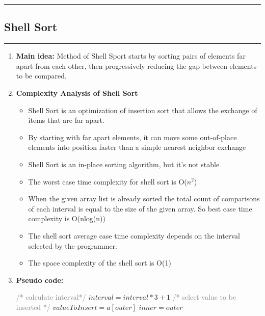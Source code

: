 \documentclass[11pt,a4paper]{article}
\begin{document}
{		\rule{15cm}{0.1cm}
		\subsection{Shell Sort}
		\rule{15cm}{0.1cm}
			\begin{enumerate}[label=\textbf{\arabic*})]
				\item \textbf{Main idea:}
				Method of Shell Sport starts by sorting pairs of elements far apart from each other, then progressively reducing the gap between elements to be compared.
				\\[12pt]
				\item \textbf{Complexity Analysis of Shell Sort}
				\begin{itemize}
				\item Shell Sort is an optimization of insertion sort that allows the exchange of items that are far apart.
                \item By starting with far apart elements, it can move some out-of-place elements into position faster than a simple nearest neighbor exchange
                \item Shell Sort is an in-place sorting algorithm, but it’s not stable
                \item The worst case time complexity for shell sort is O($n^2$)
                \item When the given array list is already sorted the total count of comparisons of each interval is equal to the size of the given array. So best case time complexity is O(nlog(n))
                \item The shell sort average case time complexity depends on the interval selected by the programmer.
                \item The space complexity of the shell sort is O(1)
                \end{itemize}
				\item \textbf{Pseudo code:} 
				\begin{algorithm}[H]
            	\begin{algorithmic}[1]
            			\State \textcolor{Gray}{/* calculate interval*/}
            				\State $interval = interval*3+1$ 
            			\EndWhile
            					\State \textcolor{Gray}{/* select value to be inserted */}
            					\State $valueToInsert = a[outer]$
            					\State $inner = outer$

\end{algorithmic}
\end{algorithm}
\end{enumerate}}
\end{document}
